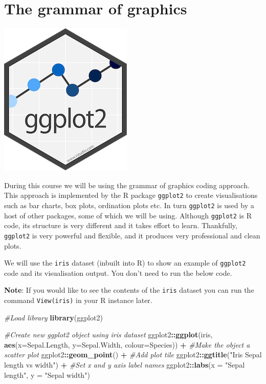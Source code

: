 \documentclass[
]{book}
\newenvironment{Shaded}{\begin{snugshade}}{\end{snugshade}}
\newcommand{\AttributeTok}[1]{\textcolor[rgb]{0.13,0.29,0.53}{#1}}
\newcommand{\CommentTok}[1]{\textcolor[rgb]{0.56,0.35,0.01}{\textit{#1}}}
\newcommand{\FunctionTok}[1]{\textcolor[rgb]{0.13,0.29,0.53}{\textbf{#1}}}
\newcommand{\NormalTok}[1]{#1}
\newcommand{\SpecialCharTok}[1]{\textcolor[rgb]{0.81,0.36,0.00}{\textbf{#1}}}
\newcommand{\StringTok}[1]{\textcolor[rgb]{0.31,0.60,0.02}{#1}}
\begin{document}
\hypertarget{the-grammar-of-graphics}{%
\section{The grammar of graphics}\label{the-grammar-of-graphics}}

\includegraphics{figures/ggplot2.png}

During this course we will be using the grammar of graphics coding approach. This approach is implemented by the R package \texttt{ggplot2} to create visualisations such as bar charts, box plots, ordination plots etc. In turn \texttt{ggplot2} is used by a host of other packages, some of which we will be using. Although \texttt{ggplot2} is R code, its structure is very different and it takes effort to learn. Thankfully, \texttt{ggplot2} is very powerful and flexible, and it produces very professional and clean plots.

We will use the \texttt{iris} dataset (inbuilt into R) to show an example of \texttt{ggplot2} code and its visualisation output. You don't need to run the below code.

\textbf{Note}: If you would like to see the contents of the \texttt{iris} dataset you can run the command \texttt{View(iris)} in your R instance later.

\begin{Shaded}
\begin{Highlighting}[]
\CommentTok{\#Load library}
\FunctionTok{library}\NormalTok{(ggplot2)}

\CommentTok{\#Create new ggplot2 object using iris dataset}
\NormalTok{ggplot2}\SpecialCharTok{::}\FunctionTok{ggplot}\NormalTok{(iris, }\FunctionTok{aes}\NormalTok{(}\AttributeTok{x=}\NormalTok{Sepal.Length, }\AttributeTok{y=}\NormalTok{Sepal.Width, }\AttributeTok{colour=}\NormalTok{Species)) }\SpecialCharTok{+}
  \CommentTok{\#Make the object a scatter plot }
\NormalTok{  ggplot2}\SpecialCharTok{::}\FunctionTok{geom\_point}\NormalTok{() }\SpecialCharTok{+}
  \CommentTok{\#Add plot tile}
\NormalTok{  ggplot2}\SpecialCharTok{::}\FunctionTok{ggtitle}\NormalTok{(}\StringTok{"Iris Sepal length vs width"}\NormalTok{) }\SpecialCharTok{+}
  \CommentTok{\#Set x and y axis label names}
\NormalTok{  ggplot2}\SpecialCharTok{::}\FunctionTok{labs}\NormalTok{(}\AttributeTok{x =} \StringTok{"Sepal length"}\NormalTok{, }\AttributeTok{y =} \StringTok{"Sepal width"}\NormalTok{)}
\end{Highlighting}
\end{Shaded}
\end{document}

